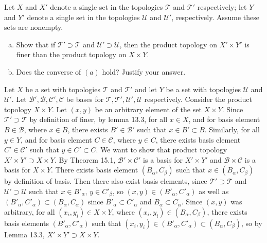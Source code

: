 \documentclass[12pt]{article}
\newenvironment{problem}[2][Problem]
{
	\begin{trivlist} 
		\item[\hskip \labelsep {\bfseries #1 #2:}]
	}
{
	\end{trivlist}
	}
\newenvironment{solution}[1][Solution]
{
	\begin{trivlist} 
		\item[\hskip \labelsep {\itshape #1:}]
	}
	{
	\end{trivlist}
}
\begin{document}
\begin{problem}[Exercise]{2.16.5}	
	Let $X$ and $X'$ denote a single set in the topologies $\mathcal{T}$ and $\mathcal{T}'$ respectively; let $Y$ and $Y'$ denote a single set in the topologies $\mathcal{U}$ and $\mathcal{U}'$, respectively. Assume these sets are nonempty. 
	\begin{enumerate}[(a)]
		\item Show that if $\mathcal{T}' \supset \mathcal{T}$ and $\mathcal{U}' \supset \mathcal{U}$, then the product topology on $X' \times Y'$ is finer than the product topology on $X \times Y$. 
		\item Does the converse of $\left(a\right)$ hold? Justify your answer. 
	\end{enumerate}
\end{problem}
\begin{solution}	
	Let $X$ be a set with topologies $\mathcal{T}$ and $\mathcal{T}'$ and let $Y$ be a set with topologies $\mathcal{U}$ and $\mathcal{U}'$. Let $\mathcal{B', B, C', C}$ be bases for $\mathcal{T, T', U', U}$ respectively.  Consider the product topology $X \times Y$. Let $(x,y)$ be an arbitrary element of the set $X \times Y$.  Since $\mathcal{T'} \supset \mathcal{T}$ by definition of finer, by lemma 13.3, for all $x \in X$, and for basis element $B \in \mathcal{B}$, where $x \in B$, there exists $B' \in \mathcal{B'}$ such that $x \in B' \subset B$. Similarly, for all $y \in Y$, and for basis element $C \in \mathcal{C}$, where $y \in C$, there exists basis element $C'\in \mathcal{C}'$ such that $y \in C' \subset C$. We want to show that product topology $X' \times Y' \supset X \times Y$. By Theorem 15.1, $\mathcal{B}' \times \mathcal{C}'$ is a basis for $X'\times Y'$ and $\mathcal{B} \times \mathcal{C}$ is a basis for $X \times Y$. There exists basis element $(B_\alpha , C_\beta)$ such that $x \in (B_\alpha , C_\beta)$ by definition of basis. Then there also exist basis elements, since $\mathcal{T}' \supset \mathcal{T}$ and $\mathcal{U}' \supset \mathcal{U}$ such that $x \in B'_\alpha$, $y \in C'_\beta$, so $(x,y) \in (B'_\alpha, C'_\alpha)$ as well as $(B'_\alpha, C'_\alpha) \subset (B_\alpha, C_\alpha)$ since $B'_\alpha \subset C'_\alpha$ and $B_\alpha \subset C_\alpha$. Since $(x, y)$ was arbitrary, for all $(x_i, y_i) \in X \times Y$, where $(x_i, y_i) \in (B_\alpha, C_\beta)$, there exists basis elements $(B'_\alpha, C'_\alpha)$ such that $(x_i, y_i ) \in (B'_\alpha, C'_\alpha) \subset (B_\alpha, C_\beta)$, so by Lemma 13.3, $X' \times Y'\supset X \times Y$. 
\end{solution}
\end{document}
